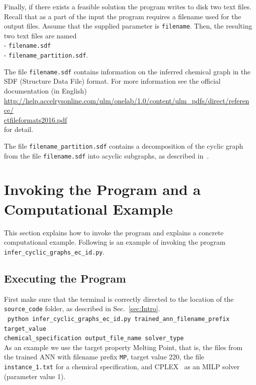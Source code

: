 \documentclass[11pt, titlepage, dvipdfmx, twoside]{article}
\begin{document}
Finally, if there exists a feasible solution the program writes to disk two text files.
Recall that as a part of the input the program requires a filename
used for the output files. 
Assume that the supplied parameter is {\tt filename}.
Then, the resulting two text files are named \\
- {\tt filename.sdf} \\
- {\tt filename\_partition.sdf}. 

\noindent
The file {\tt filename.sdf} contains information
on the inferred chemical graph in the SDF (Structure Data File)
format.
For more information see the official documentation (in English) \\
\url{http://help.accelrysonline.com/ulm/onelab/1.0/content/ulm_pdfs/direct/reference/}\\
 \url{ctfileformats2016.pdf} \\
for detail.

\noindent
The file {\tt filename\_partition.sdf} contains a 
decomposition of the cyclic graph from the 
file {\tt filename.sdf} into acyclic subgraphs,
as described in~\cite{cyclic_BH_arxiv}.



\section{Invoking the Program and a Computational Example}
\label{sec:Exp}

This section explains how to invoke the program
and explains a concrete computational example.
Following is an example of invoking the
program {\tt infer\_cyclic\_graphs\_ec\_id.py}.

 


\subsection{Executing the Program}
\label{sec:Exp_1}

First make sure that the terminal is 
correctly directed to the location
of the {\tt source\_code} folder, as described in Sec.~\ref{sec:Intro}. \\

\noindent
{\tt 
 python  infer\_cyclic\_graphs\_ec\_id.py 
trained\_ann\_filename\_prefix
target\_value \\
 \phantom{python } 
 chemical\_specification
output\_file\_name
solver\_type
 }\\


As an example we use the target property Melting Point, 
that is, the files from the trained ANN with filename prefix {\tt MP},
target value 220,
the file {\tt instance\_1.txt} for a chemical specification,
and CPLEX~\cite{cplex} as an MILP solver (parameter value 1).
\end{document}
